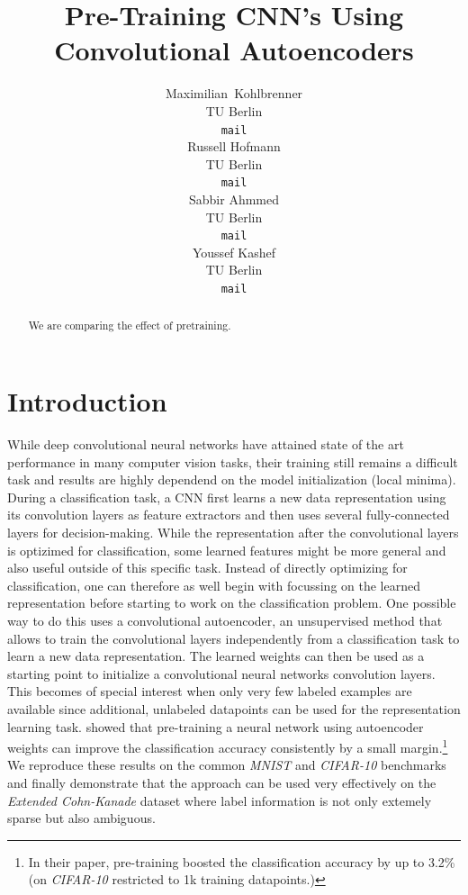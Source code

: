 \documentclass{article}
\title{Pre-Training CNN's Using Convolutional Autoencoders}
\author{
  Maximilian~Kohlbrenner\\
  TU Berlin\\
  \texttt{mail} \\
  \And
  Russell Hofmann\\
  TU Berlin\\
  \texttt{mail} \\
  \AND
  Sabbir Ahmmed \\
  TU Berlin \\
  \texttt{mail}\\
  \And
  Youssef Kashef \\
  TU Berlin \\
  \texttt{mail}
}
\begin{document}

\maketitle

\begin{abstract}
  We are comparing the effect of pretraining.
\end{abstract}


\section{Introduction}
  While deep convolutional neural networks have attained state of the art performance in many computer vision tasks, their training still remains a difficult task and results are highly dependend on the model initialization (local minima). 
  During a classification task, a CNN first learns a new data representation using its convolution layers as feature extractors and then uses several fully-connected layers for decision-making. 
  While the representation after the convolutional layers is optizimed for classification, some learned features might be more general and also useful outside of this specific task. 
  Instead of directly optimizing for classification, one can therefore as well begin with focussing on the learned representation before starting to work on the classification problem.
  One possible way to do this uses a convolutional autoencoder, an unsupervised method that allows to train the convolutional layers independently from a classification task to learn a new data representation. 
  The learned weights can then be used as a starting point to initialize a convolutional neural networks convolution layers. 
  This becomes of special interest when only very few labeled examples are available since additional, unlabeled datapoints can be used for the representation learning task. 
  \citep{masci11} showed that pre-training a neural network using autoencoder weights can improve the classification accuracy consistently by a small margin.\footnote{In their paper, pre-training boosted the classification accuracy by up to 3.2\% (on \emph{CIFAR-10} restricted to 1k training datapoints.)}
  We reproduce these results on the common \emph{MNIST} \citep{lecun1998mnist} and \emph{CIFAR-10} \citep{krizhevsky2009learning} benchmarks and finally demonstrate that the approach can be used very effectively on the \emph{Extended Cohn-Kanade} \citep{kanade2000comprehensive,lucey2010extended} dataset where label information is not only extemely sparse but also ambiguous. 
\end{document}
